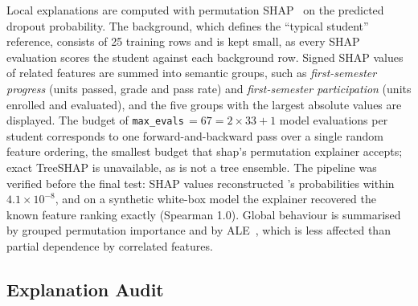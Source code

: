 Local explanations are computed with permutation SHAP~\citep{lundberg2017shap} on the predicted
dropout probability. The background, which defines the ``typical student'' reference, consists of 25
training rows and is kept small, as every SHAP evaluation scores the student against each background
row. Signed SHAP values of related features are summed into semantic groups, such as
\emph{first-semester progress} (units passed, grade and pass rate) and \emph{first-semester
participation} (units enrolled and evaluated), and the five groups with the largest absolute values
are displayed. The budget of \texttt{max\_evals}$\,=67=2\times 33+1$ model evaluations per student
corresponds to one forward-and-backward pass over a single random feature ordering, the smallest
budget that shap's permutation explainer accepts; exact TreeSHAP is unavailable, as \tabicl is not a
tree ensemble. The pipeline was verified before the final test: SHAP values reconstructed \tabicl's
probabilities within $4.1\times10^{-8}$, and on a synthetic white-box model the explainer recovered
the known feature ranking exactly (Spearman 1.0). Global behaviour is summarised by grouped
permutation importance and by ALE~\citep{apley2020ale}, which is less affected than partial
dependence by correlated features.

\subsection{Explanation Audit}

